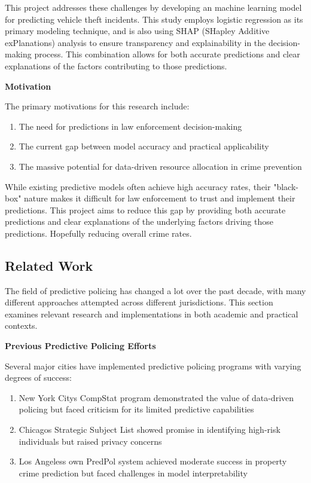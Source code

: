 \documentclass[
]{article}
\begin{document}
This project addresses these challenges by developing an machine
learning model for predicting vehicle theft incidents. This study
employs logistic regression as its primary modeling technique, and is
also using SHAP (SHapley Additive exPlanations) analysis to ensure
transparency and explainability in the decision-making process. This
combination allows for both accurate predictions and clear explanations
of the factors contributing to those predictions.

\textbf{Motivation}

The primary motivations for this research include:

\begin{enumerate}
\def\labelenumi{\arabic{enumi}.}
\item
  The need for predictions in law enforcement decision-making
\item
  The current gap between model accuracy and practical applicability
\item
  The massive potential for data-driven resource allocation in crime
  prevention
\end{enumerate}

While existing predictive models often achieve high accuracy rates,
their "black-box" nature makes it difficult for law enforcement to trust
and implement their predictions. This project aims to reduce this gap by
providing both accurate predictions and clear explanations of the
underlying factors driving those predictions. Hopefully reducing overall
crime rates.

\subsection{Related Work}\label{related-work}

The field of predictive policing has changed a lot over the past decade,
with many different approaches attempted across different jurisdictions.
This section examines relevant research and implementations in both
academic and practical contexts.

\textbf{Previous Predictive Policing Efforts}

Several major cities have implemented predictive policing programs with
varying degrees of success:

\begin{enumerate}
\def\labelenumi{\arabic{enumi}.}
\item
  New York City\textquotesingle s CompStat program demonstrated the
  value of data-driven policing but faced criticism for its limited
  predictive capabilities
\item
  Chicago\textquotesingle s Strategic Subject List showed promise in
  identifying high-risk individuals but raised privacy concerns
\item
  Los Angeles\textquotesingle s own PredPol system achieved moderate
  success in property crime prediction but faced challenges in model
  interpretability
\end{enumerate}
\end{document}
